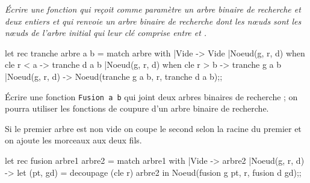 \begin{Exercise}[title =Tranche]\it
Écrire une fonction  qui reçoit comme paramètre un arbre binaire de recherche et deux entiers et qui renvoie un arbre binaire de recherche dont les nœuds sont les nœuds de l'arbre initial qui leur clé  comprise entre  et .
\end{Exercise}
\begin{Answer}
\begin{ocaml}
let rec tranche arbre a b = 
   match arbre with
   |Vide -> Vide
   |Noeud(g, r, d) when cle r < a -> tranche d a b
   |Noeud(g, r, d) when cle r > b -> tranche g a b
   |Noeud(g, r, d) -> Noeud(tranche g a b, r, tranche d a b);;
\end{ocaml}
\end{Answer}
\begin{Exercise}[title =Fusion]
Écrire une fonction {\tt Fusion a b} qui joint deux 
arbres binaires de recherche ; on pourra utiliser les fonctions de coupure d'un arbre binaire de recherche.
\end{Exercise}
\begin{Answer}
Si le premier arbre est non vide on coupe le second selon la racine du premier et on ajoute les morceaux aux deux fils.
\begin{ocaml}
let rec fusion arbre1 arbre2 =
   match arbre1 with
   |Vide -> arbre2
   |Noeud(g, r, d) -> let (pt, gd) = decoupage (cle r) arbre2 in
                      Noeud(fusion g pt, r, fusion d gd);;
\end{ocaml}
\end{Answer}
